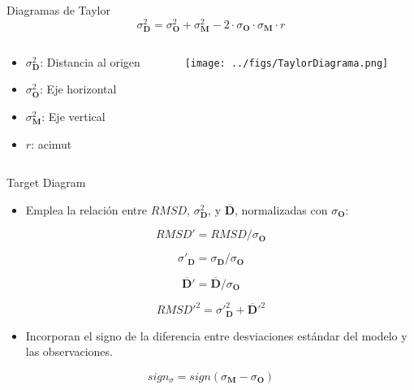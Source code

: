 \documentclass[aspectratio=169, usenames,svgnames,dvipsnames]{beamer}
\begin{document}
\begin{frame}[label={sec:org3b691b7}]{Diagramas de Taylor}
\[
\sigma^2_{\mathbf{D}} = \sigma^2_{\mathbf{O}}  + \sigma^2_{\mathbf{M}}
- 2 \cdot \sigma_{\mathbf{O}} \cdot \sigma_{\mathbf{M}} \cdot r 
\]

\begin{columns}
\begin{column}{0.4\columnwidth}
\begin{itemize}
\item \(\sigma^2_{\mathbf{D}}\): Distancia al origen
\item \(\sigma^2_{\mathbf{O}}\): Eje horizontal
\item \(\sigma^2_{\mathbf{M}}\): Eje vertical
\item \(r\): acimut
\end{itemize}
\end{column}

\begin{column}{0.7\columnwidth}
\begin{center}
\texttt{[image: ../figs/TaylorDiagrama.png]}
\end{center}
\end{column}
\end{columns}
\end{frame}


\begin{frame}[label={sec:org5fe67f0}]{Target Diagram}
\begin{itemize}
\item Emplea la relación entre \(RMSD\), \(\sigma^2_{\mathbf{D}}\), y \(\overline{\mathbf{D}}\), normalizadas con \(\sigma_{\mathbf{O}}\):
\end{itemize}
\[
RMSD' = RMSD / \sigma_{\mathbf{O}}
\]

\[
  \sigma'_{\mathbf{D}} = \sigma_{\mathbf{D}} / \sigma_{\mathbf{O}} 
\]

\[
\overline{\mathbf{D}}' = \overline{\mathbf{D}} / \sigma_{\mathbf{O}}
\]

\[
RMSD'^2= \sigma'^2_{\mathbf{D}} + \overline{\mathbf{D}}'^2
\]

\begin{itemize}
\item Incorporan el signo de la diferencia entre desviaciones estándar del modelo y las observaciones.
\end{itemize}

\[
sign_{\sigma} =  sign(\sigma_{\mathbf{M}} - \sigma_{\mathbf{O}} )
\]


\nocite{Jolliff.Kindle.ea2009}
\end{frame}
\end{document}
